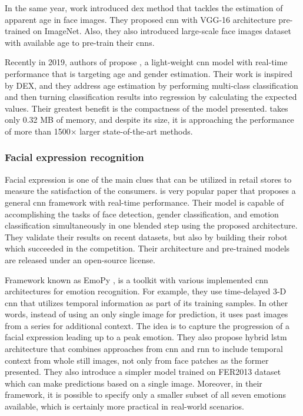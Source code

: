             In the same year, work \cite{rothe2015dex} introduced \gls{dex} method that tackles the estimation of apparent age in face images. They proposed \gls{cnn} with VGG-16 architecture pre-trained on ImageNet. Also, they also introduced large-scale face images dataset with available age to pre-train their \gls{cnn}s. 

            Recently in 2019, authors of \cite{yang2018ssr} propose , a light-weight \gls{cnn} model with real-time performance that is targeting age and gender estimation. Their work is inspired by DEX, and they address age estimation by performing multi-class classification and then turning classification results into regression by calculating the expected values. Their greatest benefit is the compactness of the model presented.  takes only 0.32 MB of memory, and despite its size, it is approaching the performance of more than 1500× larger state-of-the-art methods.
            
        \subsubsection{Facial expression recognition}
            Facial expression is one of the main clues that can be utilized in retail stores to measure the satisfaction of the consumers. \cite{arriaga2017real} is very popular paper that proposes a general \gls{cnn} framework with real-time performance. Their model is capable of accomplishing the tasks of face detection, gender classification, and emotion classification simultaneously in one blended step using the proposed architecture. They validate their results on recent datasets, but also by building their robot which succeeded in the competition. Their architecture and pre-trained models are released under an open-source license.

            Framework known as EmoPy \cite{emopy}, is a toolkit with various implemented \gls{cnn} architectures for emotion recognition. For example, they use time-delayed 3-D \gls{cnn}  that utilizes temporal information as part of its training samples. In other words, instead of using an only single image for prediction, it uses past images from a series for additional context. The idea is to capture the progression of a facial expression leading up to a peak emotion. They also propose hybrid \gls{lstm} architecture that combines approaches from \gls{cnn} and \gls{rnn} to include temporal context from whole still images, not only from face patches as the former presented. They also introduce a simpler model trained on FER2013 dataset \cite{goodfellow2013challenges} which can make predictions based on a single image. Moreover, in their framework, it is possible to specify only a smaller subset of all seven emotions available, which is certainly more practical in real-world scenarios.
            
